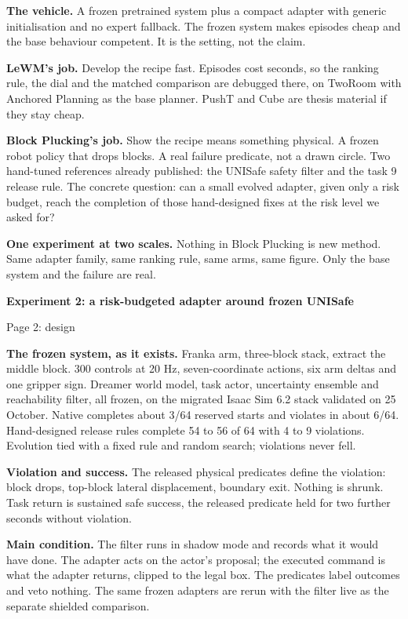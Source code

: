 \documentclass[11pt,a4paper]{article}
\begin{document}
\textbf{The vehicle.} A frozen pretrained system plus a compact adapter with
generic initialisation and no expert fallback. The frozen system makes episodes
cheap and the base behaviour competent. It is the setting, not the claim.

\textbf{LeWM's job.} Develop the recipe fast. Episodes cost seconds, so the
ranking rule, the dial and the matched comparison are debugged there, on TwoRoom
with Anchored Planning as the base planner. PushT and Cube are thesis material if
they stay cheap.

\textbf{Block Plucking's job.} Show the recipe means something physical. A frozen
robot policy that drops blocks. A real failure predicate, not a drawn circle. Two
hand-tuned references already published: the UNISafe safety filter and the task 9
release rule. The concrete question: can a small evolved adapter, given only a
risk budget, reach the completion of those hand-designed fixes at the risk level
we asked for?

\textbf{One experiment at two scales.} Nothing in Block Plucking is new method.
Same adapter family, same ranking rule, same arms, same figure. Only the base
system and the failure are real.

\newpage
{\Large\bfseries Experiment 2: a risk-budgeted adapter around frozen UNISafe}\par
{\small Page 2: design}

\textbf{The frozen system, as it exists.} Franka arm, three-block stack, extract
the middle block. 300 controls at 20 Hz, seven-coordinate actions, six arm deltas
and one gripper sign. Dreamer world model, task actor, uncertainty ensemble and
reachability filter, all frozen, on the migrated Isaac Sim 6.2 stack validated on
25 October. Native completes about 3/64 reserved starts and violates in about
6/64. Hand-designed release rules complete 54 to 56 of 64 with 4 to 9 violations.
Evolution tied with a fixed rule and random search; violations never fell.

\textbf{Violation and success.} The released physical predicates define the
violation: block drops, top-block lateral displacement, boundary exit. Nothing is
shrunk. Task return is sustained safe success, the released predicate held for two
further seconds without violation.

\textbf{Main condition.} The filter runs in shadow mode and records what it would
have done. The adapter acts on the actor's proposal; the executed command is what
the adapter returns, clipped to the legal box. The predicates label outcomes and
veto nothing. The same frozen adapters are rerun with the filter live as the
separate shielded comparison.
\end{document}
